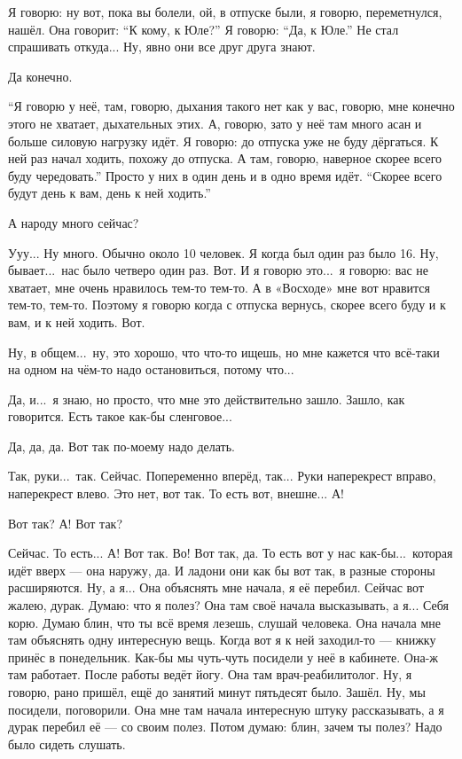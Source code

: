 \I
Я говорю: ну вот, пока вы болели, ой, в отпуске были, я говорю, переметнулся, нашёл.
Она говорит: ``К кому, к Юле?''
Я говорю: ``Да, к Юле.''
Не стал спрашивать откуда...
Ну, явно они все друг друга знают.

\M
Да конечно.

\I
``Я говорю у неё, там, говорю, дыхания такого нет как у вас, говорю, мне конечно этого не
хватает, дыхательных этих.
А, говорю, зато у неё там много асан и больше
силовую нагрузку идёт. Я говорю: до отпуска уже не буду дёргаться.
К ней раз начал ходить, похожу до отпуска. А там, говорю, наверное скорее всего
буду чередовать.''
Просто у них в один день и в одно время идёт.
``Скорее всего будут день к вам, день к ней ходить.''

\M
А народу много сейчас?

\I
Ууу... Ну много. Обычно около 10 человек.
Я когда был один раз было 16.
Ну, бывает...\ нас было четверо один раз.
Вот. И я говорю это...\ я говорю: вас не хватает, мне очень нравилось тем-то тем-то.
А в «Восходе» мне вот нравится тем-то, тем-то. Поэтому я говорю когда
с отпуска вернусь,
скорее всего буду и к вам, и к ней ходить. Вот.

\M
Ну, в общем...\ ну, это хорошо, что что-то ищешь, но мне кажется что всё-таки на одном
на чём-то надо остановиться, потому что...

\I
Да, и...\ я знаю, но просто, что мне это действительно зашло.
Зашло, как говорится.
Есть такое как-бы сленговое...

\M
Да, да, да.
Вот так по-моему надо делать.

\I
Так, руки...\ так. Сейчас. Попеременно вперёд, так...
Руки наперекрест вправо, наперекрест влево. Это нет, вот так.
То есть вот, внешне... А!

\M
Вот так? А! Вот так?

\I
Сейчас.
То есть...
А! Вот так. Во! Вот
так, да. То есть вот у нас как-бы...\ которая идёт вверх --- она наружу, да.
И ладони они как бы вот так, в разные стороны расширяются.
Ну, а я... Она объяснять мне начала, я её перебил. Сейчас вот жалею, дурак.
Думаю: что я полез? Она там своё начала высказывать, а я... Себя корю.
Думаю блин, что ты всё время лезешь, слушай человека. Она начала мне там объяснять одну
интересную вещь. Когда вот я к ней заходил-то --- книжку принёс в понедельник.
Как-бы мы чуть-чуть посидели у неё в кабинете. Она-ж там работает. После работы
ведёт йогу. Она там врач-реабилитолог. Ну, я говорю, рано пришёл, ещё до занятий
минут пятьдесят было. Зашёл. Ну, мы посидели, поговорили. Она мне там начала интересную штуку
рассказывать, а я дурак перебил её --- со своим полез. Потом думаю: блин, зачем ты полез?
Надо было сидеть слушать.

